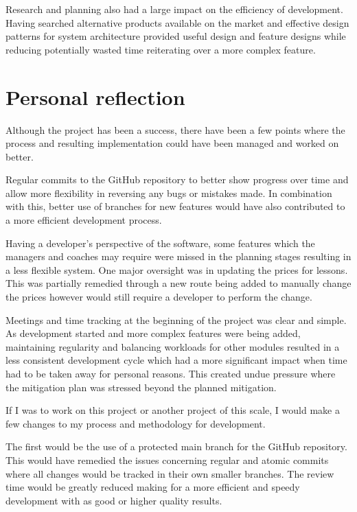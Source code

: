 Research and planning also had a large impact on the efficiency of development. Having searched alternative products available on the market and effective design patterns for system architecture provided useful design and feature designs while reducing potentially wasted time reiterating over a more complex feature.



\section{Personal reflection}

Although the project has been a success, there have been a few points where the process and resulting implementation could have been managed and worked on better.

Regular commits to the GitHub repository to better show progress over time and allow more flexibility in reversing any bugs or mistakes made. In combination with this, better use of branches for new features would have also contributed to a more efficient development process.

Having a developer's perspective of the software, some features which the managers and coaches may require were missed in the planning stages resulting in a less flexible system. One major oversight was in updating the prices for lessons. This was partially remedied through a new route being added to manually change the prices however would still require a developer to perform the change.

Meetings and time tracking at the beginning of the project was clear and simple. As development started and more complex features were being added, maintaining regularity and balancing workloads for other modules resulted in a less consistent development cycle which had a more significant impact when time had to be taken away for personal reasons. This created undue pressure where the mitigation plan was stressed beyond the planned mitigation.

If I was to work on this project or another project of this scale, I would make a few changes to my process and methodology for development.

The first would be the use of a protected main branch for the GitHub repository. This would have remedied the issues concerning regular and atomic commits where all changes would be tracked in their own smaller branches. The review time would be greatly reduced making for a more efficient and speedy development with as good or higher quality results.

